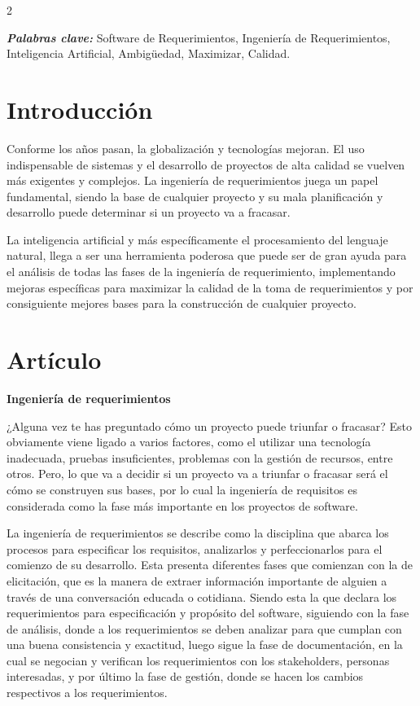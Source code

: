 \documentclass[12pt,spanish,Letterpaper,openany]{book}
\begin{document}
\begin {multicols}{2}

\textbf{\emph{Palabras clave:}} Software de Requerimientos, Ingeniería de Requerimientos, Inteligencia Artificial, Ambigüedad, Maximizar, Calidad.

\hypertarget{introducciuxf3n-8}{%
\section{Introducción}\label{introducciuxf3n-8}}

Conforme los años pasan, la globalización y tecnologías mejoran. El uso indispensable de sistemas y el desarrollo de proyectos de alta calidad se vuelven más exigentes y complejos. La ingeniería de requerimientos juega un papel fundamental, siendo la base de cualquier proyecto y su mala planificación y desarrollo puede determinar si un proyecto va a fracasar.

La inteligencia artificial y más específicamente el procesamiento del lenguaje natural, llega a ser una herramienta poderosa que puede ser de gran ayuda para el análisis de todas las fases de la ingeniería de requerimiento, implementando mejoras específicas para maximizar la calidad de la toma de requerimientos y por consiguiente mejores bases para la construcción de cualquier proyecto.

\hypertarget{artuxedculo-8}{%
\section{Artículo}\label{artuxedculo-8}}

\textbf{Ingeniería de requerimientos}

¿Alguna vez te has preguntado cómo un proyecto puede triunfar o fracasar? Esto obviamente viene ligado a varios factores, como el utilizar una tecnología inadecuada, pruebas insuficientes, problemas con la gestión de recursos, entre otros. Pero, lo que va a decidir si un proyecto va a triunfar o fracasar será el cómo se construyen sus bases, por lo cual la ingeniería de requisitos es considerada como la fase más importante en los proyectos de software.

La ingeniería de requerimientos se describe como la disciplina que abarca los procesos para especificar los requisitos, analizarlos y perfeccionarlos para el comienzo de su desarrollo. Esta presenta diferentes fases que comienzan con la de elicitación, que es la manera de extraer información importante de alguien a través de una conversación educada o cotidiana. Siendo esta la que declara los requerimientos para especificación y propósito del software, siguiendo con la fase de análisis, donde a los requerimientos se deben analizar para que cumplan con una
buena consistencia y exactitud, luego sigue la fase de documentación, en la cual se negocian y verifican los requerimientos con los stakeholders, personas interesadas, y por último la fase de gestión, donde se hacen los cambios respectivos a los requerimientos.


\end{multicols}
\end{document}
